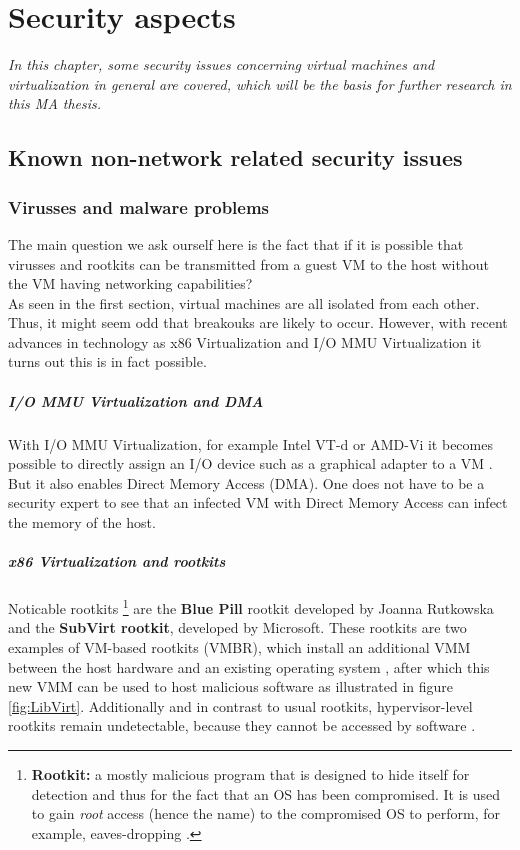 \chapter{Security aspects}
\label{chap:security}
\emph{In this chapter, some security issues concerning virtual machines and virtualization in general are covered, which will be the basis for further research in this MA thesis.}

\section{Known non-network related security issues}

\subsection{Virusses and malware problems}

The main question we ask ourself here is the fact that if it is possible that virusses and rootkits can be transmitted from a guest VM to the host without the VM having networking capabilities? \\

As seen in the first section, virtual machines are all isolated from each other. Thus, it might seem odd that breakouks are likely to occur. However, with recent advances in technology as x86 Virtualization and I/O MMU Virtualization it turns out this is in fact possible. \\

\paragraph{I/O MMU Virtualization and DMA} With I/O MMU Virtualization, for example Intel VT-d \citep{VTD} or AMD-Vi \citep{AMDVI} it becomes possible to directly assign an I/O device such as a graphical adapter to a VM \citep{HardwareVirt4}. But it also enables Direct Memory Access (DMA). One does not have to be a security expert to see that an infected VM with Direct Memory Access can infect the memory of the host.

\clearpage

\paragraph{x86 Virtualization and rootkits} Noticable rootkits \footnote{\textbf{Rootkit:} a mostly malicious program that is designed to hide itself for detection and thus for the fact that an OS has been compromised. It is used to gain \emph{root} access (hence the name) to the compromised OS to perform, for example, eaves-dropping \citep{VMBR, Rootkit}.} are the \textbf{Blue Pill} rootkit developed by Joanna Rutkowska and the \textbf{SubVirt rootkit}, developed by Microsoft. These rootkits are two examples of VM-based rootkits (VMBR), which install an additional VMM between the host hardware and an existing operating system \citep{BluePill,LibVirt}, after which this new VMM can be used to host malicious software as illustrated in figure \ref{fig:LibVirt}.  Additionally and in contrast to usual rootkits, hypervisor-level rootkits remain undetectable, because they cannot be accessed by software \citep{BluePill,VMBR}.

